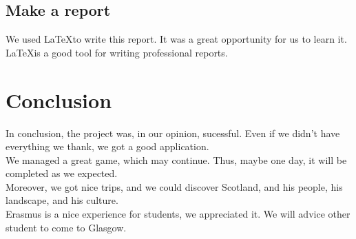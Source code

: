 \documentclass{scrreprt}
\begin{document}
					\section{Make a report}
					We used \LaTeX  to write this report. It was a great opportunity for us to learn it. \LaTeX is a good tool for writing professional reports.

					\chapter*{Conclusion} %
					
					In conclusion, the project was, in our opinion, sucessful. Even if we didn't have everything we thank, we got a good application.\\
					
					We managed a great game, which may continue. Thus, maybe one day, it will be completed as we expected.\\

					Moreover, we got nice trips, and we could discover Scotland, and his people, his landscape, and his culture.\\
		
					Erasmus is a nice experience for students, we appreciated it. We will advice other student to come to Glasgow.


					\appendix
\end{document}
